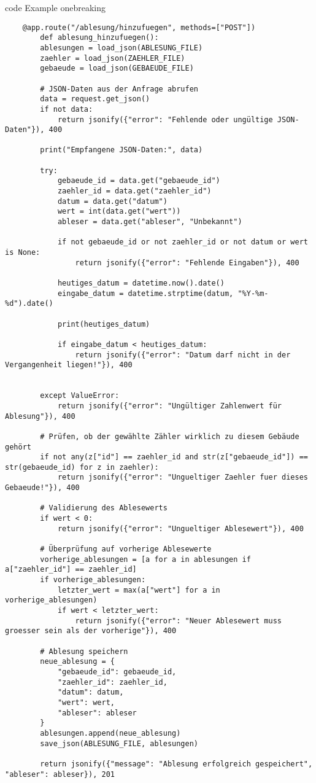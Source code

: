 \begin{code}{code Example one}{breaking}
    \begin{verbatim}
    @app.route("/ablesung/hinzufuegen", methods=["POST"])
        def ablesung_hinzufuegen():
        ablesungen = load_json(ABLESUNG_FILE)
        zaehler = load_json(ZAEHLER_FILE)
        gebaeude = load_json(GEBAEUDE_FILE)

        # JSON-Daten aus der Anfrage abrufen
        data = request.get_json()
        if not data:
            return jsonify({"error": "Fehlende oder ungültige JSON-Daten"}), 400

        print("Empfangene JSON-Daten:", data)

        try:
            gebaeude_id = data.get("gebaeude_id")
            zaehler_id = data.get("zaehler_id")
            datum = data.get("datum")
            wert = int(data.get("wert"))
            ableser = data.get("ableser", "Unbekannt")

            if not gebaeude_id or not zaehler_id or not datum or wert is None:
                return jsonify({"error": "Fehlende Eingaben"}), 400

            heutiges_datum = datetime.now().date()
            eingabe_datum = datetime.strptime(datum, "%Y-%m-%d").date()

            print(heutiges_datum)

            if eingabe_datum < heutiges_datum:
                return jsonify({"error": "Datum darf nicht in der Vergangenheit liegen!"}), 400


        except ValueError:
            return jsonify({"error": "Ungültiger Zahlenwert für Ablesung"}), 400

        # Prüfen, ob der gewählte Zähler wirklich zu diesem Gebäude gehört
        if not any(z["id"] == zaehler_id and str(z["gebaeude_id"]) == str(gebaeude_id) for z in zaehler):
            return jsonify({"error": "Ungueltiger Zaehler fuer dieses Gebaeude!"}), 400

        # Validierung des Ablesewerts
        if wert < 0:
            return jsonify({"error": "Ungueltiger Ablesewert"}), 400

        # Überprüfung auf vorherige Ablesewerte
        vorherige_ablesungen = [a for a in ablesungen if a["zaehler_id"] == zaehler_id]
        if vorherige_ablesungen:
            letzter_wert = max(a["wert"] for a in vorherige_ablesungen)
            if wert < letzter_wert:
                return jsonify({"error": "Neuer Ablesewert muss groesser sein als der vorherige"}), 400

        # Ablesung speichern
        neue_ablesung = {
            "gebaeude_id": gebaeude_id,
            "zaehler_id": zaehler_id,
            "datum": datum,
            "wert": wert,
            "ableser": ableser
        }
        ablesungen.append(neue_ablesung)
        save_json(ABLESUNG_FILE, ablesungen)

        return jsonify({"message": "Ablesung erfolgreich gespeichert", "ableser": ableser}), 201
    \end{verbatim}
\end{code}

